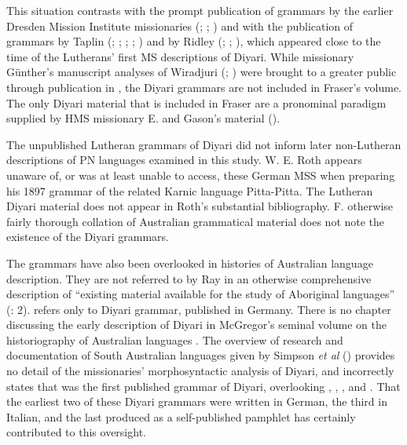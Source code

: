 This situation contrasts with the prompt publication of grammars by the earlier Dresden Mission Institute missionaries (\citealt{teichelmann_outlines_1840}; \citealt{meyer_vocabulary_1843}; \citealt{schurmann_letter_1844}) and with the publication of grammars by Taplin (\citeyear{taplin_notes_1872}; \citeyear{taplin_native_1874}; \citeyear{taplin_1879a_nodate}; \citeyear{taplin_grammar_1880}; ) and by Ridley (\citeyear{ridley_kamilaroi_1866}; \citeyear{ridley_kamilaroi_1875}; ), which appeared close to the time of the Lutherans' first MS descriptions of Diyari. While missionary Günther’s manuscript analyses of Wiradjuri (\citeyear{gunther_native_1838}; \citeyear{gunther_lecture_1840}) were brought to a greater public through publication in \citet{fraser_australian_1892}, the Diyari grammars are not included in Fraser’s volume. The only Diyari material that is included in Fraser are a pronominal paradigm supplied by HMS missionary E. \citet[43--44]{homann_diyeri_1892} and Gason’s material (\citeyear[44--45]{gason_dieyerie_1874}).

The unpublished Lutheran grammars of Diyari did not inform later non-Lu\-ther\-an descriptions of PN languages examined in this study. W. E. Roth appears unaware of, or was at least unable to access, these German MSS when preparing his 1897 grammar of the related Karnic language Pitta-Pitta. The Lutheran Diyari material does not appear in Roth’s substantial bibliography. F.  otherwise fairly thorough collation of Australian grammatical material does not note the existence of the Diyari grammars.

The grammars have also been overlooked in histories of Australian language description. They are not referred to by Ray in an otherwise comprehensive description of “existing material available for the study of Aboriginal languages” (\citeyear{ray_aboriginal_1925}: 2). \citet[9]{elkin_nature_1937}  refers only to   Diyari grammar, published in Germany. There is no chapter discussing the early description of Diyari in McGregor’s seminal volume on the historiography of Australian languages \citeyearpar{mcgregor_introduction_2008}. The overview of research and documentation of South Australian languages given by Simpson \textit{et al} (\citeyear[120]{simpson_i_2008}) provides no detail of the missionaries' morphosyntactic analysis of Diyari, and incorrectly states that \citet{austin_switch_1981} was the first published grammar of Diyari, overlooking \citet{eylmann_eingeborenen_1908}, \citet{planert_australische_1908}, \citet{gatti_lingua_1930}, and \citet{schoknecht_grammar_1947}. That the earliest two of these Diyari grammars were written in German, the third in Italian, and the last produced as a self-published pamphlet has certainly contributed to this oversight.

